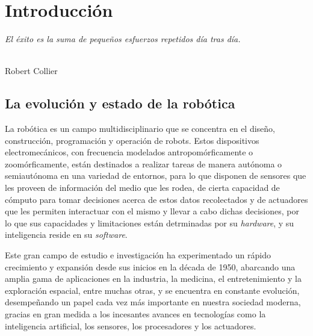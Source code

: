 \chapter{Introducción}
\label{cap:capitulo1}
\setcounter{page}{1}

\begin{flushright}
\begin{minipage}[]{10cm}
\emph{El éxito es la suma de pequeños esfuerzos repetidos día tras día.}\\
\end{minipage}\\

Robert Collier\\
\end{flushright}

\vspace{1cm}



\section{La evolución y estado de la robótica}
\label{sec:robotica} %

La robótica es un campo multidisciplinario que se concentra en el diseño,
construcción, programación y operación de robots.
Estos dispositivos electromecánicos, con frecuencia modelados
antropomórficamente o zoomórficamente, están destinados a realizar tareas de
manera autónoma o semiautónoma en una variedad de entornos, para lo que disponen
de sensores que les proveen de información del medio que les rodea, de cierta
capacidad de cómputo para tomar decisiones acerca de estos datos recolectados y
de actuadores que les permiten interactuar con el mismo y llevar a cabo dichas
decisiones, por lo que sus capacidades y limitaciones están detrminadas por su
\textit{hardware}, y su inteligencia reside en su \textit{software}.

Este gran campo de estudio e investigación ha experimentado un rápido
crecimiento y expansión desde sus inicios en la década de 1950, abarcando una
amplia gama de aplicaciones en la industria, la medicina, el entretenimiento y
la exploración espacial, entre muchas otras, y se encuentra en constante
evolución, desempeñando un papel cada vez más importante en nuestra sociedad
moderna, gracias en gran medida a los incesantes avances en tecnologías como la
inteligencia artificial, los sensores, los procesadores y los actuadores.

